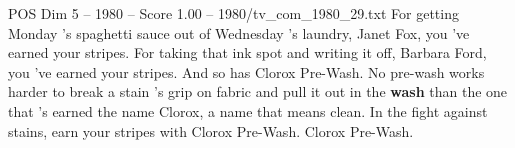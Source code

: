 \begin{textsample}{POS Dim 5 – 1980 – Score 1.00 – 1980/tv\_com\_1980\_29.txt}  \label{ex:f5_pos_015}
For getting Monday 's spaghetti sauce out of Wednesday 's laundry, Janet Fox, you 've earned your stripes.
For taking that ink spot and writing it off, Barbara Ford, you 've earned your stripes.
And so has Clorox Pre-Wash.
No pre-wash works harder to break a stain 's grip on fabric and pull it out in the \textbf{wash} than the one that 's earned the name Clorox, a name that means clean.
In the fight against stains, earn your stripes with Clorox Pre-Wash.
Clorox Pre-Wash.

\end{textsample}
